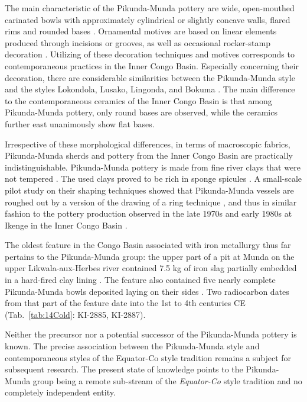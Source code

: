 \documentclass[smallextended,natbib]{svjour3}       %
\begin{document}
The main characteristic of the Pikunda-Munda pottery are wide, open-mouthed carinated bowls with approximately cylindrical or slightly concave walls, flared rims and rounded bases \citep[Fig.~\ref{fig:sangha}.3;][311--314]{Eggert.1993}. Ornamental motives are based on linear elements produced through incisions or grooves, as well as occasional rocker-stamp decoration \citep[362 Appendix 4.12]{Seidensticker.2021e}. Utilizing of these decoration techniques and motives corresponds to contemporaneous practices in the Inner Congo Basin. Especially concerning their decoration, there are considerable similarities between the Pikunda-Munda style and the styles Lokondola, Lusako, Lingonda, and Bokuma \citep[107]{Wotzka.1995}. The main difference to the contemporaneous ceramics of the Inner Congo Basin is that among Pikunda-Munda pottery, only round bases are observed, while the ceramics further east unanimously show flat bases.

Irrespective of these morphological differences, in terms of macroscopic fabrics, Pikunda-Munda sherds and pottery from the Inner Congo Basin are practically indistinguishable. Pikunda-Munda pottery is made from fine river clays that were not tempered \citep[66--67 Fig.~21]{Seidensticker.2021e}. The used clays proved to be rich in sponge spicules \citep{Seidensticker.2020}. A small-scale pilot study on their shaping techniques showed that Pikunda-Munda vessels are roughed out by a version of the drawing of a ring technique \citep[47--51 Fig.~13; 72--73 Tab.~13]{Seidensticker.2021e}, and thus in similar fashion to the pottery production observed in the late 1970s and early 1980s at Ikenge in the Inner Congo Basin \citep{Eggert.1980c}.

The oldest feature in the Congo Basin associated with iron metallurgy thus far pertains to the Pikunda-Munda group: the upper part of a pit at Munda on the upper Likwala-aux-Herbes river contained 7.5 kg of iron slag partially embedded in a hard-fired clay lining \citep[321--330]{Seidensticker.2021e}. The feature also contained five nearly complete Pikunda-Munda bowls deposited laying on their sides \citep[323 Fig.~157.A--E; Pl.~91.1--5]{Seidensticker.2021e}. Two radiocarbon dates from that part of the feature date into the 1st to 4th centuries CE (Tab.~\ref{tab:14Cold}: KI-2885, KI-2887).

Neither the precursor nor a potential successor of the Pikunda-Munda pottery is known. The precise association between the Pikunda-Munda style and contemporaneous styles of the Equator-Co style tradition remains a subject for subsequent research. The present state of knowledge points to the Pikunda-Munda group being a remote sub-stream of the \textit{Equator-Co} style tradition and no completely independent entity.
\end{document}
